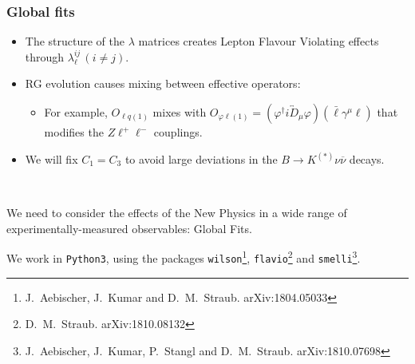 \documentclass[mathserif, 10pt]{beamer}
\begin{document}
\begin{frame}
    \frametitle{Global fits}
    \begin{itemize}
        \item The structure of the $\lambda$ matrices creates Lepton Flavour Violating effects through $\lambda_\ell^{ij}\, (i\neq j)$.
        \item RG evolution causes mixing between effective operators:
              \begin{itemize}
                  \item For example, $O_{\ell q(1)}$ mixes with $O_{\varphi \ell(1)} = (\varphi^\dagger i \overleftrightarrow D_{\mu} \varphi)(\bar{\ell} \gamma^\mu \ell )$ that modifies the $Z\ell^+\ell^-$ couplings.
              \end{itemize}
\item We will fix $C_1 = C_3$ to avoid large deviations in the $B\to K^{(*)}\nu\overline{\nu}$ decays.
    \end{itemize}

    ~

    We need to consider the effects of the New Physics in a wide range of experimentally-measured observables: Global Fits.

We work in \texttt{Python3}, using the packages \texttt{wilson}\footnote[1]{J.~Aebischer, J.~Kumar and D.~M.~Straub. arXiv:1804.05033}, \texttt{flavio}\footnote[2]{D.~M.~Straub. arXiv:1810.08132} and \texttt{smelli}\footnote[3]{J.~Aebischer, J.~Kumar, P.~Stangl and D.~M.~Straub. arXiv:1810.07698}.


\end{frame}
\end{document}
